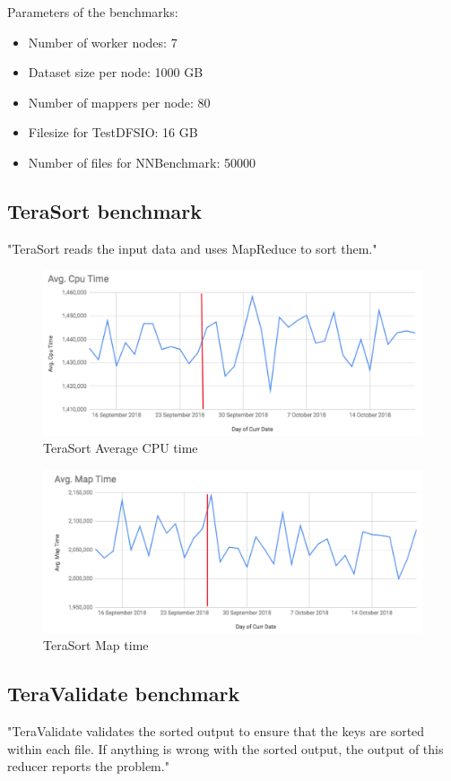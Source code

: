 \noindent Parameters of the benchmarks: 
\begin{itemize}
	\setlength{\itemsep}{1pt}
	\item Number of worker nodes: 7
	\item Dataset size per node: 1000 GB
	\item Number of mappers per node: 80
	\item Filesize for TestDFSIO: 16 GB
	\item Number of files for NNBenchmark: 50000
\end{itemize}

\subsection{TeraSort benchmark}
"TeraSort reads the input data and uses MapReduce to sort them." \cite{terasort}

\begin{figure}[H]
	\includegraphics[width=125mm, keepaspectratio]{figures/terasort_cpu.png}
	\centering
	\caption{TeraSort Average CPU time}
\end{figure}
\begin{figure}[H]
	\includegraphics[width=125mm, keepaspectratio]{figures/terasort_map.png}
	\centering
	\caption{TeraSort Map time}
\end{figure}
\subsection{TeraValidate benchmark}
"TeraValidate validates the sorted output to ensure that the keys are sorted within each file. If anything is wrong with the sorted output, the output of this reducer reports the problem." \cite{terasort}

